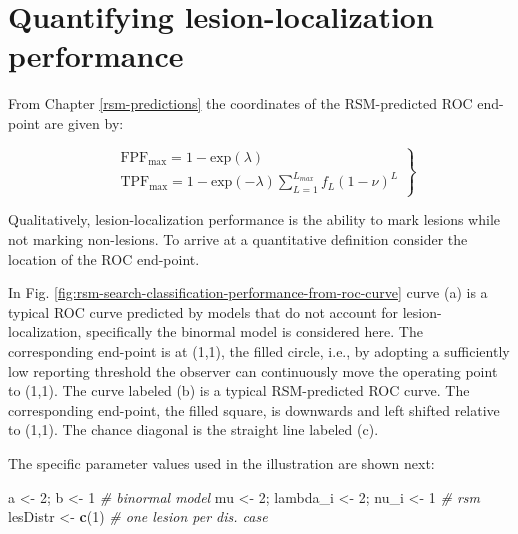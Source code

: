 \documentclass[
]{book}
\newenvironment{Shaded}{\begin{snugshade}}{\end{snugshade}}
\newcommand{\CommentTok}[1]{\textcolor[rgb]{0.56,0.35,0.01}{\textit{#1}}}
\newcommand{\DecValTok}[1]{\textcolor[rgb]{0.00,0.00,0.81}{#1}}
\newcommand{\KeywordTok}[1]{\textcolor[rgb]{0.13,0.29,0.53}{\textbf{#1}}}
\newcommand{\NormalTok}[1]{#1}
\newcommand{\StringTok}[1]{\textcolor[rgb]{0.31,0.60,0.02}{#1}}
\begin{document}
\hypertarget{rsm-search-classification-quantifying}{%
\section{Quantifying lesion-localization performance}\label{rsm-search-classification-quantifying}}

From Chapter \ref{rsm-predictions} the coordinates of the RSM-predicted ROC end-point are given by:

\begin{equation}
\left. 
\begin{aligned}
&\text{FPF}_{\text{max}} = 1 - \text{exp}\left (\lambda \right ) \\
&\text{TPF}_{\text{max}} = 1 - \text{exp} \left ( - \lambda \right )\sum_{L=1}^{L_{max}}f_L \left ( 1 - \nu \right )^L
\end{aligned}
\right \}
\label{eq:rsm-search-classification-FPF-TPF-max}
\end{equation}

Qualitatively, lesion-localization performance is the ability to mark lesions while not marking non-lesions. To arrive at a quantitative definition consider the location of the ROC end-point.

In Fig. \ref{fig:rsm-search-classification-performance-from-roc-curve} curve (a) is a typical ROC curve predicted by models that do not account for lesion-localization, specifically the binormal model is considered here. The corresponding end-point is at (1,1), the filled circle, i.e., by adopting a sufficiently low reporting threshold the observer can continuously move the operating point to (1,1). The curve labeled (b) is a typical RSM-predicted ROC curve. The corresponding end-point, the filled square, is downwards and left shifted relative to (1,1). The chance diagonal is the straight line labeled (c).

The specific parameter values used in the illustration are shown next:

\begin{Shaded}
\begin{Highlighting}[]
\NormalTok{a <-}\StringTok{ }\DecValTok{2}\NormalTok{; b <-}\StringTok{ }\DecValTok{1} \CommentTok{# binormal model}
\NormalTok{mu <-}\StringTok{ }\DecValTok{2}\NormalTok{; lambda_i <-}\StringTok{ }\DecValTok{2}\NormalTok{; nu_i <-}\StringTok{ }\DecValTok{1} \CommentTok{# rsm}
\NormalTok{lesDistr <-}\StringTok{ }\KeywordTok{c}\NormalTok{(}\DecValTok{1}\NormalTok{) }\CommentTok{# one lesion per dis. case}
\end{Highlighting}
\end{Shaded}
\end{document}
